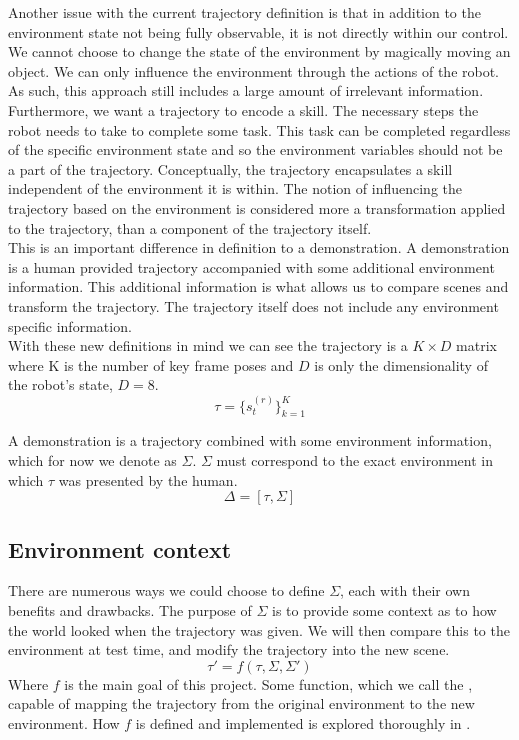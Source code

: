 Another issue with the current trajectory definition is that in addition to the environment state not being fully observable, it is not directly within our control. We cannot choose to change the state of the environment by magically moving an object. We can only influence the environment through the actions of the robot. As such, this approach still includes a large amount of irrelevant information. Furthermore, we want a trajectory to encode a skill. The necessary steps the robot needs to take to complete some task. This task can be completed regardless of the specific environment state and so the environment variables should not be a part of the trajectory. Conceptually, the trajectory encapsulates a skill independent of the environment it is within. The notion of influencing the trajectory based on the environment is considered more a transformation applied to the trajectory, than a component of the trajectory itself.\\

This is an important difference in definition to a demonstration. A demonstration is a human provided trajectory accompanied with some additional environment information. This additional information is what allows us to compare scenes and transform the trajectory. The trajectory itself does not include any environment specific information.\\

With these new definitions in mind we can see the trajectory is a $K \times D$ matrix where K is the number of key frame poses and $D$ is only the dimensionality of the robot's state, $D = 8$.
$$\tau = \{s^{(r)}_t\}_{k=1}^K$$

A demonstration is a trajectory combined with some environment information, which for now we denote as $\Sigma$. $\Sigma$ must correspond to the exact environment in which $\tau$ was presented by the human.
$$\Delta = [\tau, \Sigma]$$

\subsection{Environment context}
There are numerous ways we could choose to define $\Sigma$, each with their own benefits and drawbacks. The purpose of $\Sigma$ is to provide some context as to how the world looked when the trajectory was given. We will then compare this to the environment at test time, and modify the trajectory into the new scene.
$$\tau' = f(\tau, \Sigma, \Sigma')$$
Where $f$ is the main goal of this project. Some function, which we call the , capable of mapping the trajectory from the original environment to the new environment. How $f$ is defined and implemented is explored thoroughly in .\\

